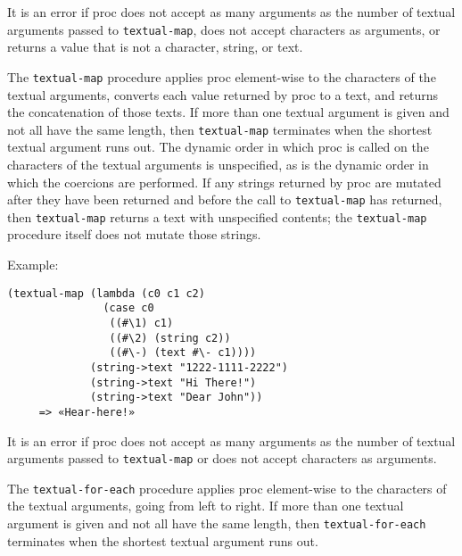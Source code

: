 \begin{entry}{%
  }

  It is an error if proc does not accept as many arguments as
  the number of textual arguments passed to \texttt{textual-map}, does
  not accept characters as arguments, or returns a value that is not a
  character, string, or text.

  The \texttt{textual-map} procedure applies proc element-wise to the
  characters of the textual arguments, converts each value returned by
  proc to a text, and returns the concatenation of those texts. If
  more than one textual argument is given and not all have the same
  length, then \texttt{textual-map} terminates when the shortest
  textual argument runs out. The dynamic order in which proc is called
  on the characters of the textual arguments is unspecified, as is the
  dynamic order in which the coercions are performed. If any strings
  returned by proc are mutated after they have been returned and
  before the call to \texttt{textual-map} has returned, then
  \texttt{textual-map} returns a text with unspecified contents; the
  \texttt{textual-map} procedure itself does not mutate those strings.

  Example:

\begin{verbatim}
(textual-map (lambda (c0 c1 c2)
               (case c0
                ((#\1) c1)
                ((#\2) (string c2))
                ((#\-) (text #\- c1))))
             (string->text "1222-1111-2222")
             (string->text "Hi There!")
             (string->text "Dear John"))
     => «Hear-here!»
\end{verbatim}
\end{entry}

\begin{entry}{%
  }

  It is an error if proc does not accept
  as many arguments as the number of textual arguments passed to
  \texttt{textual-map} or does not accept characters as arguments.

  The \texttt{textual-for-each} procedure applies proc element-wise to
  the characters of the textual arguments, going from left to
  right. If more than one textual argument is given and not all have
  the same length, then \texttt{textual-for-each} terminates when the
  shortest textual argument runs out.
\end{entry}

